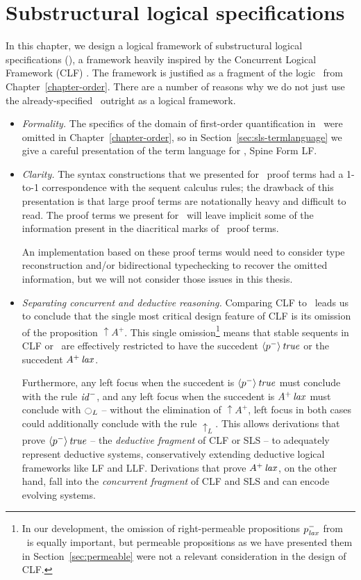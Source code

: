 \chapter{Substructural logical specifications}
\label{chapter-framework}

In this chapter, we design a logical framework of substructural
logical specifications (\sls), a framework heavily inspired by the
Concurrent Logical Framework (CLF) \cite{watkins02concurrent}. The
framework is justified as a fragment of the logic \ollll~from
Chapter~\ref{chapter-order}. 
There are a number of reasons why we do not just use the
already-specified \ollll~outright as a logical framework.
%
\smallskip
\begin{itemize}
\item{\it Formality.} The specifics of the domain of first-order
  quantification in \ollll~were omitted in Chapter~\ref{chapter-order}, so in
  Section~\ref{sec:sls-termlanguage} we give a careful presentation of
  the term language for \sls, Spine Form LF.

\item{\it Clarity.} The syntax constructions that we presented for
  \ollll~proof terms had a 1-to-1 correspondence with the sequent
  calculus rules; the drawback of this presentation is that large
  proof terms are notationally heavy and difficult to read. The proof
  terms we present for \sls~will leave implicit some of the
  information present in the diacritical marks of \ollll~proof
  terms. 

  An implementation based on these proof terms would need to consider
  type reconstruction and/or bidirectional typechecking to recover the
  omitted information, but we will not consider those issues in this
  thesis.

\item{\it Separating concurrent and deductive reasoning.} Comparing
  CLF to \ollll~leads us to
  conclude that the single most critical design feature of CLF is its
  omission of the proposition ${\uparrow}A^+$. This single
  omission\footnote{In our development, the omission of
    right-permeable propositions $p^-_{\it lax}$ from \ollll~is equally
    important, but permeable propositions as we have presented them in
    Section~\ref{sec:permeable} were not a relevant consideration in
    the design of CLF.} means that stable sequents in CLF or \sls~are
  effectively restricted to have the succedent ${\langle {p^-} \rangle}\,{{\it true}}$
  or the succedent ${A^+}\,{{\it lax}}$.

  Furthermore, any left focus when the succedent is
  ${\langle {p^-} \rangle}\,{{\it true}}$ must conclude with the rule ${\it id}^-$, and
  any left focus when the succedent is ${A^+}\,{{\it lax}}$ must conclude
  with ${\ocircle}_L$ -- without the elimination of ${\uparrow}A^+$,
  left focus in both cases could additionally conclude with the rule
  ${\uparrow}_L$. This allows derivations that prove
  ${\langle {p^-} \rangle}\,{{\it true}}$ -- the {\it deductive fragment} of CLF or SLS
  -- to adequately represent deductive systems, conservatively
  extending deductive logical frameworks like LF and LLF. Derivations
  that prove ${A^+}\,{{\it lax}}$, on the other hand, fall into the {\it
    concurrent fragment} of CLF and SLS and can encode evolving
  systems.
 

\end{itemize}
